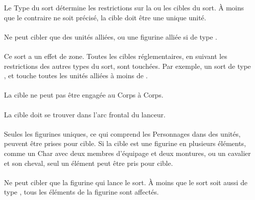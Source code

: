 Le Type du sort détermine les restrictions sur la ou les cibles du sort. À moins que le contraire ne soit précisé, la cible doit être une unique unité.

\paragraph{\augment}

Ne peut cibler que des unités alliées, ou une figurine alliée si de type \focused{}.

\paragraph{\aura}

Ce sort a un effet de zone. Toutes les cibles réglementaires, en suivant les restrictions des autres types du sort, sont touchées. Par exemple, un sort de type \aura{}, \augment{} et  touche toutes les unités alliées à moins de .

\paragraph{\damage}

La cible ne peut pas être engagée au Corps à Corps.

\paragraph{\direct}

La cible doit se trouver dans l'arc frontal du lanceur.

\paragraph{\focused}

Seules les figurines uniques, ce qui comprend les Personnages dans des unités, peuvent être prises pour cible. Si la cible est une figurine en plusieurs éléments, comme un Char avec deux membres d'équipage et deux montures, ou un cavalier et son cheval, seul un élément peut être pris pour cible.

\paragraph{\caster}

Ne peut cibler que la figurine qui lance le sort. À moins que le sort soit aussi de type \focused{}, tous les éléments de la figurine sont affectés.

